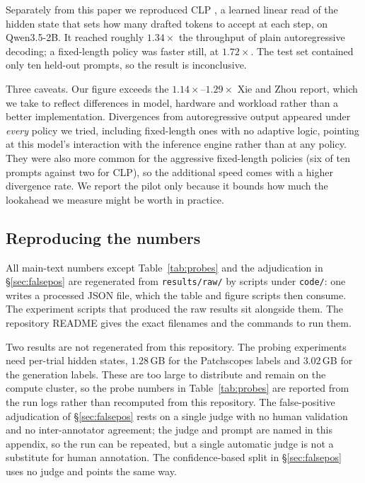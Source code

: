 Separately from this paper we reproduced CLP \citep{xie-zhou-2026-clp}, a
learned linear read of the hidden state that sets how many drafted tokens to
accept at each step, on Qwen3.5-2B. It reached roughly $1.34\times$ the
throughput of plain autoregressive decoding; a fixed-length policy was faster
still, at $1.72\times$. The test set contained only ten held-out prompts, so
the result is inconclusive.

Three caveats. Our figure exceeds the $1.14\times$--$1.29\times$ Xie and Zhou
report, which we take to reflect differences in model, hardware and workload
rather than a better implementation. Divergences from autoregressive output
appeared under \emph{every} policy we tried, including fixed-length ones with
no adaptive logic, pointing at this model's interaction with the inference
engine rather than at any policy. They were also more common for the aggressive
fixed-length policies (six of ten prompts against two for CLP), so the
additional speed comes with a higher divergence rate. We report the pilot only
because it bounds how much the lookahead we measure might be worth in practice.

\subsection{Reproducing the numbers}

All main-text numbers except Table~\ref{tab:probes} and the adjudication in
\S\ref{sec:falsepos} are regenerated from \texttt{results/raw/} by scripts
under \texttt{code/}: one writes a processed JSON file, which the table and
figure scripts then consume. The experiment scripts that produced the raw
results sit alongside them. The repository README gives the exact filenames and
the commands to run them.

Two results are not regenerated from this repository. The probing experiments
need per-trial hidden states, $1.28$\,GB for the Patchscopes labels and
$3.02$\,GB for the generation labels. These are too large to distribute and
remain on the compute cluster, so the probe numbers in Table~\ref{tab:probes}
are reported from the run logs rather than recomputed from this repository. The
false-positive adjudication of \S\ref{sec:falsepos} rests on a single judge
with no human validation and no inter-annotator agreement; the judge and prompt
are named in this appendix, so the run can be repeated, but a single automatic
judge is not a substitute for human annotation. The confidence-based split in
\S\ref{sec:falsepos} uses no judge and points the same way.